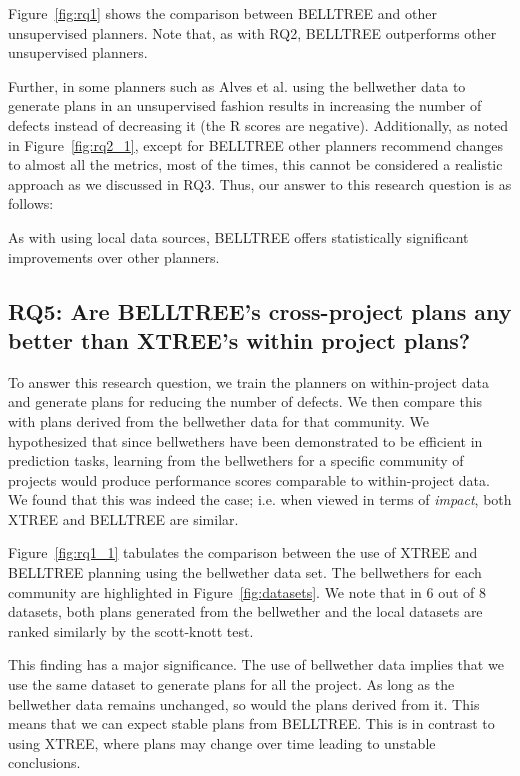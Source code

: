 \documentclass[10pt,journal,compsoc]{IEEEtran}
\newcommand{\fig}[1]{Figure~\ref{fig:#1}}
\begin{document}
\fig{rq1} shows the comparison between BELLTREE and other unsupervised planners. Note that, as with RQ2, BELLTREE outperforms other unsupervised planners. 

Further, in some planners such as Alves et al. using the bellwether data to generate plans in an unsupervised fashion results in increasing the number of defects instead of decreasing it (the R scores are negative). Additionally, as noted in \fig{rq2_1}, except for BELLTREE other planners recommend changes to almost all the metrics, most of the times, this cannot be considered a realistic approach as we discussed in RQ3. Thus, our answer to this research question is as follows:

\begin{lesson}
As with using local data sources, BELLTREE offers statistically significant improvements over other planners.\\[-0.2cm]
\end{lesson}

\subsection*{{\bf RQ5: Are BELLTREE's cross-project plans any better than XTREE's within project plans?}}

To answer this research question, we train the planners on within-project data and generate plans for reducing the number of defects. We then compare this with plans derived from the bellwether data for that community. We hypothesized that since bellwethers have been demonstrated to be efficient in prediction tasks, learning from the bellwethers for a specific community of projects would produce performance scores comparable to within-project data. We found that this was indeed the case; i.e. when viewed in terms of \textit{impact}, both XTREE and BELLTREE are similar.

\fig{rq1_1} tabulates the comparison between the use of XTREE and BELLTREE planning using the bellwether data set. The bellwethers for each community are highlighted in \fig{datasets}. We note that in 6 out of 8 datasets, both plans generated from the bellwether and the local datasets are ranked similarly by the scott-knott test. 

This finding has a major significance. The use of bellwether data implies that we use the same dataset to generate plans for all the project. As long as the bellwether data remains unchanged, so would the plans derived from it. This means that we can expect stable plans from BELLTREE. This is in contrast to
using XTREE, where plans may change over time leading to unstable conclusions.
\end{document}
